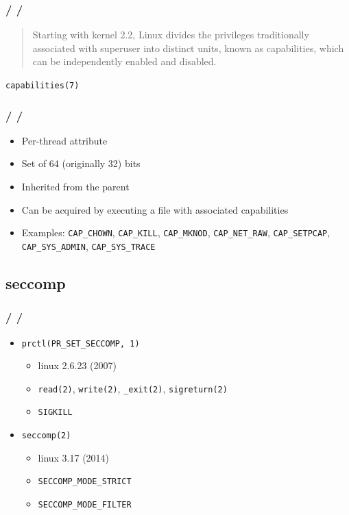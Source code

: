 \documentclass{beamer}
\newcommand{\autotitle}
{\frametitle{
    \secname
    \ifx\insertsubsection\empty
    \else
        /\subsecname
        \ifx\insertsubsubsection\empty\else/\subsubsecname\fi
    \fi}}
\begin{document}
\begin{frame}
    \autotitle
    \begin{quote}
        Starting with kernel 2.2, Linux divides the privileges traditionally
        associated with superuser into distinct units, known as capabilities,
        which can be independently enabled and disabled.
    \end{quote}
    \texttt{capabilities(7)}
\end{frame}

\begin{frame}
    \autotitle
    \begin{itemize}
        \item Per-thread attribute
        \item Set of 64 (originally 32) bits
        \item Inherited from the parent
        \item Can be acquired by executing a file with associated capabilities
        \item
            Examples: \texttt{CAP\_CHOWN}, \texttt{CAP\_KILL},
            \texttt{CAP\_MKNOD}, \texttt{CAP\_NET\_RAW}, \texttt{CAP\_SETPCAP},
            \texttt{CAP\_SYS\_ADMIN}, \texttt{CAP\_SYS\_TRACE}
    \end{itemize}
\end{frame}

\subsection{seccomp}

\begin{frame}
    \autotitle
    \begin{itemize}
        \item \texttt{prctl(PR\_SET\_SECCOMP, 1)}
        \begin{itemize}
            \item linux 2.6.23 (2007)
            \item
                \texttt{read(2)}, \texttt{write(2)}, \texttt{\_exit(2)},
                \texttt{sigreturn(2)}
            \item \texttt{SIGKILL}
        \end{itemize}
        \item \texttt{seccomp(2)}
        \begin{itemize}
            \item linux 3.17 (2014)
            \item \texttt{SECCOMP\_MODE\_STRICT}
            \item \texttt{SECCOMP\_MODE\_FILTER}
        \end{itemize}
    \end{itemize}
\end{frame}
\end{document}
